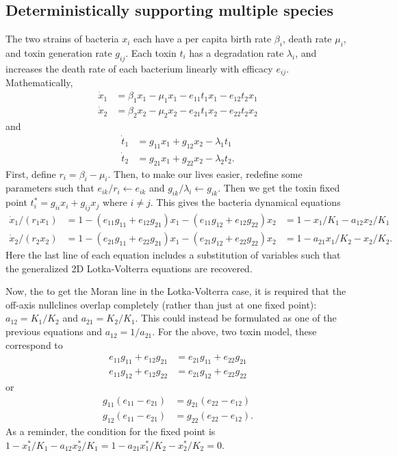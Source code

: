 \documentclass[a4paper,11pt]{article}
\numberwithin{equation}{section} %
\begin{document}
\subsection{Deterministically supporting multiple species}

The two strains of bacteria $x_i$ each have a per capita birth rate $\beta_i$, death rate $\mu_i$, and toxin generation rate $g_{ij}$. 
Each toxin $t_i$ has a degradation rate $\lambda_i$, and increases the death rate of each bacterium linearly with efficacy $e_{ij}$. 
Mathematically, 
\begin{align*}
\dot{x}_1 &= \beta_1 x_1 - \mu_1 x_1 - e_{11} t_1 x_1 - e_{12} t_2 x_1 \\
\dot{x}_2 &= \beta_2 x_2 - \mu_2 x_2 - e_{21} t_1 x_2 - e_{22} t_2 x_2
\end{align*}
and
\begin{align*}
\dot{t}_1 &= g_{11}x_1+g_{12}x_2 - \lambda_1 t_1 \\
\dot{t}_2 &= g_{21}x_1+g_{22}x_2 - \lambda_2 t_2.
\end{align*}
First, define $r_i = \beta_i-\mu_i$. 
Then, to make our lives easier, redefine some parameters such that $e_{ik}/r_i \leftarrow e_{ik}$ and $g_{ik}/\lambda_i \leftarrow g_{ik}$. 
Then we get the toxin fixed point $t^*_i=g_{ii}x_i+g_{ij}x_j$ where $i\neq j$. This gives the bacteria dynamical equations
\begin{align*}
\dot{x}_1/(r_1 x_1) &= 1 - (e_{11}g_{11}+e_{12}g_{21}) x_1 - (e_{11}g_{12}+e_{12}g_{22}) x_2 &= 1 - x_1/K_1 - a_{12}x_2/K_1 \\
\dot{x}_2/(r_2 x_2) &= 1 - (e_{21}g_{11}+e_{22}g_{21}) x_1 - (e_{21}g_{12}+e_{22}g_{22}) x_2 &= 1 - a_{21}x_1/K_2 - x_2/K_2. 
\end{align*}
Here the last line of each equation includes a substitution of variables such that the generalized 2D Lotka-Volterra equations are recovered. 

Now, the to get the Moran line in the Lotka-Volterra case, it is required that the off-axis nullclines overlap completely (rather than just at one fixed point): $a_{12}=K_1/K_2$ and $a_{21}=K_2/K_1$. 
This could instead be formulated as one of the previous equations and $a_{12}=1/a_{21}$. 
For the above, two toxin model, these correspond to
\begin{align}
e_{11}g_{11}+e_{12}g_{21}&=e_{21}g_{11}+e_{22}g_{21} \\
e_{11}g_{12}+e_{12}g_{22}&=e_{21}g_{12}+e_{22}g_{22}
\end{align}
or
\begin{align*}
g_{11}(e_{11}-e_{21})&=g_{21}(e_{22}-e_{12}) \\
g_{12}(e_{11}-e_{21})&=g_{22}(e_{22}-e_{12}). 
\end{align*}
As a reminder, the condition for the fixed point is $1 - x^*_1/K_1 - a_{12}x^*_2/K_1=1 - a_{21}x^*_1/K_2 - x^*_2/K_2=0$. 
\end{document}
